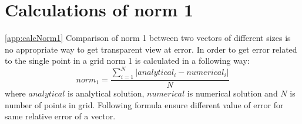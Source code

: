 \section{Calculations of norm 1} \ref{app:calcNorm1}
	Comparison of norm 1 between two vectors of different sizes is no appropriate way to get transparent view at error. In order to get error related to the single point in a grid norm 1 is calculated in a following way:
	\begin{equation}
		norm_1=\frac{\sum_{i=1}^{N}|analytical_i - numerical_i|}{N}
	\end{equation}
	where $analytical$ is analytical solution, $numerical$ is numerical solution and $N$ is number of points in grid. Following formula ensure different value of error for same relative error of a vector.
\clearpage